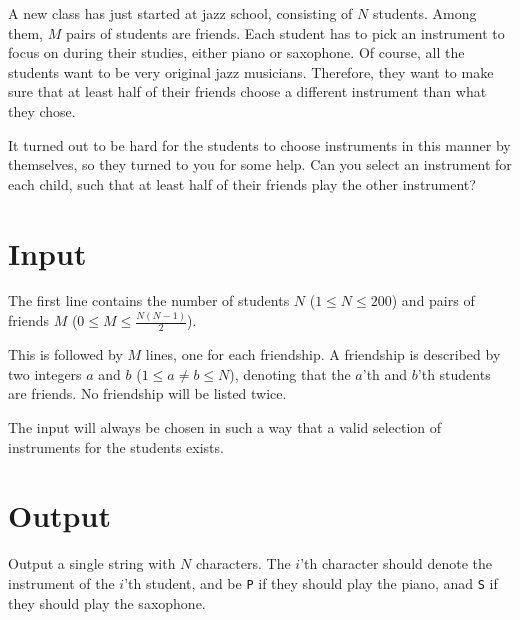 A new class has just started at jazz school, consisting of $N$ students.
Among them, $M$ pairs of students are friends.
Each student has to pick an instrument to focus on during their studies, either piano or saxophone.
Of course, all the students want to be very original jazz musicians.
Therefore, they want to make sure that at least half of their friends choose a different instrument than what they chose.

It turned out to be hard for the students to choose instruments in this manner by themselves, so they turned to you for some help.
Can you select an instrument for each child, such that at least half of their friends play the other instrument?

\section*{Input}
The first line contains the number of students $N$ ($1 \le N \le 200$) and pairs of friends $M$ ($0 \le M \le \frac{N(N - 1)}{2}$).

This is followed by $M$ lines, one for each friendship.
A friendship is described by two integers $a$ and $b$ ($1 \le a \neq b \le N$), denoting that the $a$'th and $b$'th students are friends.
No friendship will be listed twice.

The input will always be chosen in such a way that a valid selection of instruments for the students exists.

\section*{Output}
Output a single string with $N$ characters.
The $i$'th character should denote the instrument of the $i$'th student, and be \texttt{P} if they should play the piano, anad \texttt{S} if they should play the saxophone.

